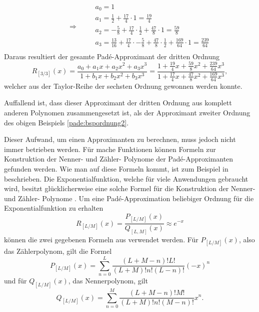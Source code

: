 \begin{beispiel}
\begin{equation}
\begin{array}{l}
\end{array}
\qquad\Rightarrow\qquad
\begin{array}{l}
a_{0}=1 \\
a_{1}=\frac{1}{2}+\frac{17}{4} \cdot 1 = \frac{19}{4}\\
a_{2}=-\frac{5}{8} +\frac{17}{4}\cdot \frac{1}{2} +\frac{47}{8} \cdot 1 = \frac{59}{8} \\
a_{3}=\frac{13}{16}+\frac{17}{4}\cdot -\frac{5}{8} + \frac{47}{8}\cdot \frac{1}{2} + \frac{169}{64} \cdot 1 = \frac{239}{64}\\
\end{array}
\end{equation}
Daraus resultiert der gesamte Padé-Approximant der dritten Ordnung
\begin{equation}
R_{[3/ 3]}(x)
=
\frac{a_0+a_1x+a_2 x^2+a_3x^3}
{1+b_1x+b_2 x^2+b_3 x^3}
=
\frac{1+\frac{19}{4}x+\frac{59}{8}x^2+\frac{239}{64}x^3}
{1+\frac{17}{4}x+\frac{47}{8}x^2+\frac{169}{64}x^3},
\end{equation}
welcher aus der Taylor-Reihe der sechsten Ordnung gewonnen werden konnte.

Auffallend ist, dass dieser Approximant der dritten Ordnung aus komplett anderen Polynomen zusammengesetzt ist, als der Approximant zweiter Ordnung des obigen Beispiels \ref{pade:bspordnung2}.
\end{beispiel}

Dieser Aufwand, um einen Approximanten zu berechnen, muss jedoch nicht immer betrieben werden.
Für mache Funktionen können Formeln zur Konstruktion der Nenner- und Zähler- Polynome der Padé-Approximanten gefunden werden.
Wie man auf diese Formeln kommt, ist zum Beispiel in \cite{pade:Baker2009} beschrieben.
Die Exponentialfunktion, welche für viele Anwendungen gebraucht wird, besitzt glücklicherweise eine solche Formel für die Konstruktion der Nenner- und Zähler- Polynome \cite{pade:moler}.
Um eine  Padé-Approximation beliebiger Ordnung für die Exponentialfunktion zu erhalten 
\begin{equation}
R_{[L/M]}(x)
=
\frac{P_{[L/ M]}(x)}{Q_{[L, M]}(x)} \approx e^{-x}
\end{equation}
können die zwei gegebenen Formeln aus \cite{pade:moler} verwendet werden.
Für $P_{[L/ M]}(x)$, also das Zählerpolynom, gilt die Formel
\begin{equation}
P_{[L/ M]}(x)
=
\sum_{n=0}^{L} \frac{(L+M-n) ! L !}{(L+M) ! n !(L-n) !}(-x)^{n}
\label{pade:expP}
\end{equation}
und für $Q_{[L/ M]}(x)$, das Nennerpolynom, gilt
\begin{equation}
Q_{[L/ M]}(x)
=
\sum_{n=0}^{M} \frac{(L+M-n) ! M !}{(L+M) ! n !(M-n) !} x^{n}.
\label{pade:expQ}
\end{equation}



